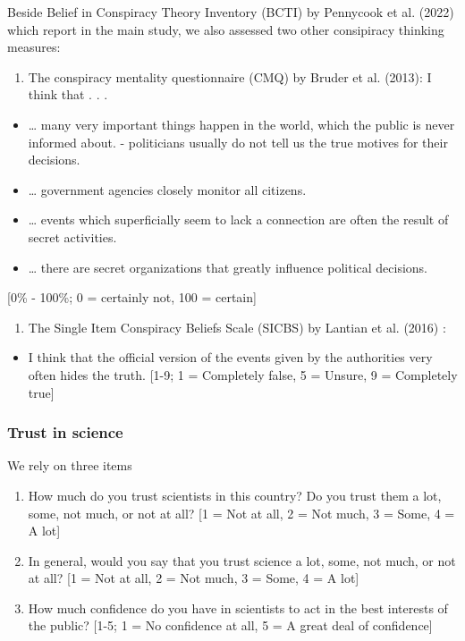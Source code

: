 \documentclass[
  doc,floatsintext]{apa6}
\providecommand{\tightlist}{%
  \setlength{\itemsep}{0pt}\setlength{\parskip}{0pt}}
\begin{document}
Beside Belief in Conspiracy Theory Inventory (BCTI) by Pennycook et al. (2022) which report in the main study, we also assessed two other consipiracy thinking measures:

\begin{enumerate}
\def\labelenumi{\arabic{enumi}.}
\tightlist
\item
  The conspiracy mentality questionnaire (CMQ) by Bruder et al. (2013):
  I think that . . .
\end{enumerate}

\begin{itemize}
\tightlist
\item
  \ldots{} many very important things happen in the world, which the public is never informed about. - politicians usually do not tell us the true motives for their decisions.
\item
  \ldots{} government agencies closely monitor all citizens.
\item
  \ldots{} events which superficially seem to lack a connection are often the result of secret activities.
\item
  \ldots{} there are secret organizations that greatly influence political decisions.
\end{itemize}

{[}0\% - 100\%; 0 = certainly not, 100 = certain{]}

\begin{enumerate}
\def\labelenumi{\arabic{enumi}.}
\setcounter{enumi}{1}
\tightlist
\item
  The Single Item Conspiracy Beliefs Scale (SICBS) by Lantian et al. (2016) :
\end{enumerate}

\begin{itemize}
\tightlist
\item
  I think that the official version of the events given by the authorities very often hides the truth. {[}1-9; 1 = Completely false, 5 = Unsure, 9 = Completely true{]}
\end{itemize}

\hypertarget{trust-in-science-1}{%
\subsubsection{Trust in science}\label{trust-in-science-1}}

We rely on three items

\begin{enumerate}
\def\labelenumi{\arabic{enumi}.}
\item
  How much do you trust scientists in this country? Do you trust them a lot, some, not much, or not at all? {[}1 = Not at all, 2 = Not much, 3 = Some, 4 = A lot{]}
\item
  In general, would you say that you trust science a lot, some, not much, or not at all? {[}1 = Not at all, 2 = Not much, 3 = Some, 4 = A lot{]}
\item
  How much confidence do you have in scientists to act in the best interests of the public? {[}1-5; 1 = No confidence at all, 5 = A great deal of confidence{]}
\end{enumerate}
\end{document}
